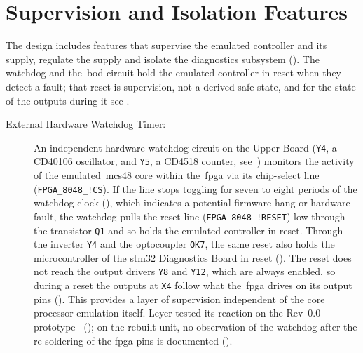 \section{Supervision and Isolation Features}
\label{sec:redundancy_failsafe}

The design includes features that supervise the emulated controller and its supply, regulate the supply and isolate the diagnostics subsystem (). The watchdog and the~\gls{bod} circuit hold the emulated controller in reset when they detect a fault; that reset is supervision, not a derived safe state, and for the state of the outputs during it see .

\begin{description}
	\item[External Hardware Watchdog Timer:] An independent hardware watchdog circuit on the Upper Board (\texttt{Y4}, a CD40106 oscillator, and \texttt{Y5}, a CD4518 counter, see~) monitors the activity of the emulated~\gls{mcs48} core within the~\gls{fpga} via its chip-select line (\texttt{FPGA\_8048\_!CS}). If the line stops toggling for seven to eight periods of the watchdog clock (), which indicates a potential firmware hang or hardware fault, the watchdog pulls the reset line (\texttt{FPGA\_8048\_!RESET}) low through the transistor \texttt{Q1} and so holds the emulated controller in reset. Through the inverter \texttt{Y4} and the optocoupler \texttt{OK7}, the same reset also holds the microcontroller of the \gls{stm32} Diagnostics Board in reset (). The reset does not reach the output drivers \texttt{Y8} and \texttt{Y12}, which are always enabled, so during a reset the outputs at \texttt{X4} follow what the~\gls{fpga} drives on its output pins (). This provides a layer of supervision independent of the core processor emulation itself. Leyer tested its reaction on the Rev~0.0 prototype~\cite[Sec.~4.6]{leyer2023} (); on the rebuilt unit, no observation of the watchdog after the re-soldering of the \gls{fpga} pins is documented ().

\end{description}
